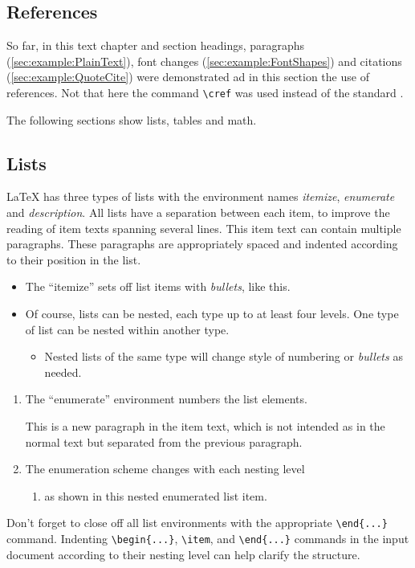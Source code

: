 \subsection{References}
\label{sec:example:references}

So far, in this text chapter and section headings, paragraphs (\cref{sec:example:PlainText}), font changes (\cref{sec:example:FontShapes}) and citations (\cref{sec:example:QuoteCite}) were demonstrated ad in this section the use of references. Not that here the command \texttt{\textbackslash{}cref} was used instead of the standard .

The following sections show lists, tables and math.

\subsection{Lists}
\label{sec:example:lists}
%
LaTeX has three types of lists with the environment names \emph{itemize}, \emph{enumerate} and \emph{description}. All lists have a separation between each item, to improve the reading of item texts spanning several lines. 
This item text can contain multiple paragraphs. These paragraphs are appropriately spaced and indented according to their position in the list.

\begin{itemize}
\item 
The \enquote{itemize} sets off list items with \emph{bullets}, like this.
%
\item Of course, lists can be nested, each type up to at least four levels.
One type of list can be nested within another type.
%
  \begin{itemize}
  \item Nested lists of the same type will change style of numbering 
  or \emph{bullets} as needed.
  \end{itemize}
\end{itemize}
%
\begin{enumerate}
\item The \enquote{enumerate} environment numbers the list elements.

This is a new paragraph in the item text, which is not intended as in the 
normal text but separated from the previous paragraph.
%
\item The enumeration scheme changes with each nesting level
  \begin{enumerate}
  \item as shown in this nested enumerated list item.
  \end{enumerate}
\end{enumerate}  
%
Don't forget to close off all list environments with the 
appropriate \verb+\end{...}+ command.
Indenting \verb+\begin{...}+, \verb+\item+, and \verb+\end{...}+
commands in the input document according to their nesting level can help 
clarify the structure.


